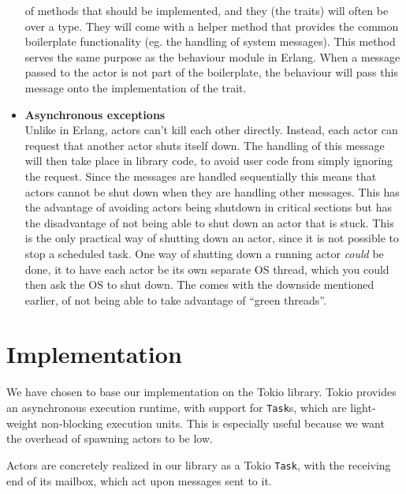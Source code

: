\documentclass[a4paper]{article}
\begin{document}
\begin{itemize}
  of methods that should be implemented, and they (the traits) will often be
  over a type. They will come with a helper method that provides the common
  boilerplate functionality (eg. the handling of system messages). This
  method serves the same purpose as the behaviour module in Erlang. When a
  message passed to the actor is not part of the boilerplate, the behaviour
  will pass this message onto the implementation of the trait.
\item \textbf{Asynchronous exceptions}\\
  Unlike in Erlang, actors can't kill each other directly. Instead, each
  actor can request that another actor shuts itself down. The handling of
  this message will then take place in library code, to avoid user code from
  simply ignoring the request. Since the messages are handled sequentially this
  means that actors cannot be shut down when they are handling other
  messages. This has the advantage of avoiding actors being shutdown in critical
  sections but has the disadvantage of not being able to shut down an actor that
  is stuck. This is the only practical way of shutting down an actor, since it
  is not possible to stop a scheduled task. One way of shutting down a running
  actor \textit{could} be done, it to have each actor be its own separate OS
  thread, which you could then ask the OS to shut down. The comes with the
  downside mentioned earlier, of not being able to take advantage of ``green
  threads''.
\end{itemize}

\section{Implementation}
We have chosen to base our implementation on the Tokio library. Tokio provides an
asynchronous execution runtime, with support for \texttt{Task}s, which are
light-weight non-blocking execution units. This is especially useful because we
want the overhead of spawning actors to be low.

Actors are concretely realized in our library as a Tokio \texttt{Task}, with the
receiving end of its mailbox, which act upon messages sent to it.
\end{document}
